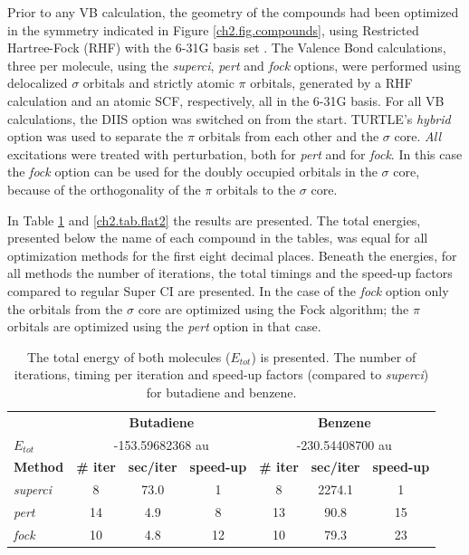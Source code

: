 Prior to any VB calculation, the geometry of the compounds had been optimized in the symmetry indicated in Figure \ref{ch2.fig.compounds}, using Restricted Hartree-Fock (RHF) with the \mbox{6-31G} basis set \cite{631g1,631g2}. The Valence Bond calculations, three per molecule, using the \textit{superci}, \textit{pert} and \textit{fock} options, were performed using delocalized $\sigma$ orbitals and strictly atomic $\pi$ orbitals, generated by a RHF calculation and an atomic SCF, respectively, all in the 6-31G basis. For all VB calculations, the DIIS option was switched on from the start. TURTLE's \textit{hybrid} option was used to separate the $\pi$ orbitals from each other and the $\sigma$ core. \textit{All} excitations were treated with perturbation, both for \textit{pert} and for \textit{fock}. In this case the \textit{fock} option can be used for the doubly occupied orbitals in the $\sigma$ core, because of the orthogonality of the $\pi$ orbitals to the $\sigma$ core. 

In Table \ref{ch2.tab.flat1} and \ref{ch2.tab.flat2} the results are presented. The total energies, presented below the name of each compound in the tables, was equal for all optimization methods for the first eight decimal places. Beneath the energies, for all methods the number of iterations, the total timings and the speed-up factors compared to regular Super CI are presented. In the case of the \textit{fock} option only the orbitals from the $\sigma$ core are optimized using the Fock algorithm; the $\pi$ orbitals are optimized using the \textit{pert} option in that case.

\begin{table}[htbp]
\caption{The total energy of both molecules ($E_{tot}$) is presented. The number of iterations, timing per iteration and speed-up factors (compared to \textit{superci}) for butadiene and benzene.}
\begin{center}
\begin{tabular}{l c c c c c c}
\hline
&\multicolumn{3}{c}{\textbf{Butadiene}}&\multicolumn{3}{c}{\textbf{Benzene}}\\
$E_{tot}$&\multicolumn{3}{c}{-153.59682368 au}&\multicolumn{3}{c}{-230.54408700 au}\\
\textbf{Method}&\textbf{\# iter}&\textbf{sec/iter}&\textbf{speed-up}&\textbf{\# iter}&\textbf{sec/iter}&\textbf{speed-up}\\
\hline
\textit{superci}&8&73.0&1&8&2274.1&1\\
\textit{pert}&14&4.9&8&13&90.8&15\\
\textit{fock}&10&4.8&12&10&79.3&23\\
\end{tabular}
\label{ch2.tab.flat1}
\end{center}
\end{table}

